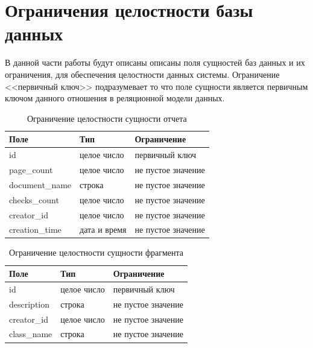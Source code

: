 \section{Ограничения целостности базы данных}
В данной части работы будут описаны описаны поля сущностей баз данных и их ограничения, для обеспечения целостности данных системы. Ограничение <<первичный ключ>> подразумевает то что поле сущности является первичным ключом данного отношения в реляционной модели данных.
\begin{table}[h!tbp]
	\centering
	\caption{Ограничение целостности сущности отчета}
	\begin{tabularx}{\textwidth}{|X|X|X|}
		\hline
		Поле & Тип & Ограничение \\
		\hline
		id & целое число & первичный ключ \\
		\hline
		page\_count & целое число & не пустое значение\\
		\hline
		document\_name & строка & не пустое значение\\
		\hline
		checks\_count & целое число & не пустое значение\\
		\hline
		creator\_id & целое число & не пустое значение\\
		\hline
		creation\_time & дата и время & не пустое значение\\
		\hline
	\end{tabularx}

	\label{t:documents_cons}
\end{table}

\begin{table}[h!tbp]
	\centering
	\caption{Ограничение целостности сущности фрагмента}
	\begin{tabularx}{\textwidth}{|X|X|X|}
		\hline
		Поле & Тип & Ограничение \\
		\hline
	  	id & целое число & первичный ключ \\
	  	\hline
		description & строка & не пустое значение \\
		\hline
		creator\_id & целое число & не пустое значение\\
		\hline
		class\_name & строка & не пустое значение\\
		\hline
	\end{tabularx}
	
	\label{t:markup_type_cons}
\end{table}

